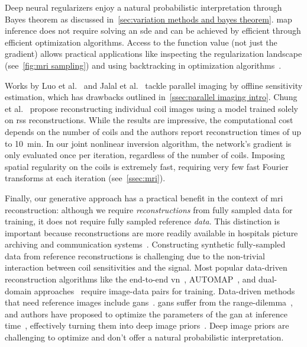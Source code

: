 Deep neural regularizers enjoy a natural probabilistic interpretation through Bayes theorem as discussed in~\cref{sec:variation methods and bayes theorem}.
\Gls{map} inference does not require solving an \gls{sde} and can be achieved by efficient through efficient optimization algorithms.
Access to the function value (not just the gradient) allows practical applications like inspecting the regularization landscape (see~\cref{fig:mri sampling}) and using backtracking in optimization algorithms~\cite{pock_inertial_2016}.%

Works by Luo et al.~\cite{luo_bayesian_2023} and Jalal et al.~\cite{jalal_robust_comporessed_2021} tackle parallel imaging by offline sensitivity estimation, which has drawbacks outlined in~\cref{ssec:parallel imaging intro}.
Chung et al.~\cite{chung_scoremri_2022} propose reconstructing individual coil images using a model trained solely on \gls{rss} reconstructions.
While the results are impressive, the computational cost depends on the number of coils and the authors report reconstruction times of up to \qty{10}{\minute}.
In our joint nonlinear inversion algorithm, the network's gradient is only evaluated once per iteration, regardless of the number of coils.
Imposing spatial regularity on the coils is extremely fast, requiring very few fast Fourier transforms at each iteration (see~\cref{ssec:mri}).

Finally, our generative approach has a practical benefit in the context of \gls{mri} reconstruction:
although we require \emph{reconstructions} from fully sampled data for training, it does not require fully sampled reference \emph{data}.
This distinction is important because reconstructions are more readily available in hospitals picture archiving and communication systems~\cite{zbontar_fastmri_2018}.
Constructing synthetic fully-sampled data from reference reconstructions is challenging due to the non-trivial interaction between coil sensitivities and the signal.
Most popular data-driven reconstruction algorithms like the end-to-end \gls{vn}~\cite{sriram_endtoend_2020}, AUTOMAP~\cite{zhu_image_2018}, and dual-domain approaches~\cite{tu_collaborative_2023,zhou2020dudornet} require image-data pairs for training.
Data-driven methods that need reference images include \glspl{gan}~\cite{Narnhofer2019}.
\Glspl{gan} suffer from the range-dilemma~\cite{bora_compressed_2017}, and authors have proposed to optimize the parameters of the \gls{gan} at inference time~\cite{Narnhofer2019}, effectively turning them into deep image priors~\cite{ulyanov_dip_2018}.
Deep image priors are challenging to optimize and don't offer a natural probabilistic interpretation.
